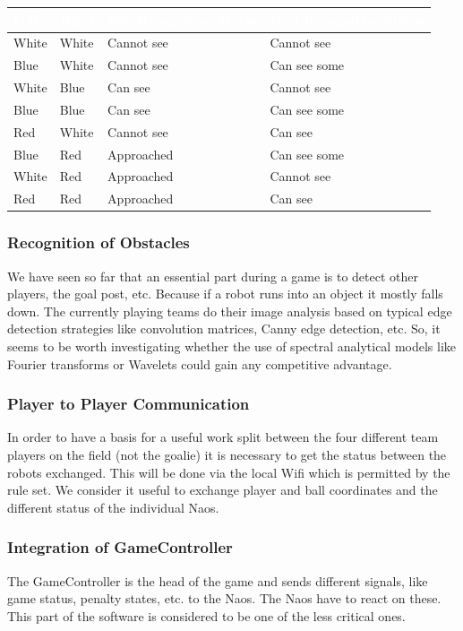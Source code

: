 \documentclass[12pt]{article}
\theoremstyle{definition}
\begin{document}
\begin{tabular}{|p{.08\linewidth}|p{.08\linewidth}|p{.31\linewidth}|p{.31\linewidth}|}
\hline
\cellcolor[gray]{0.5}\textcolor{white}{Left} & \cellcolor[gray]{0.45}\textcolor{white}{Right} & \cellcolor[gray]{0.5}\textcolor{white}{Ball Recognition Status} & \cellcolor[gray]{0.45}\textcolor{white}{Goal Recognition Status}\\ \hline
White&White&Cannot see & Cannot see \\ \hline
Blue&White&Cannot see & Can see some \\ \hline
White&Blue&Can see & Cannot see \\ \hline 
Blue&Blue&Can see & Can see some \\ \hline
Red&White& Cannot see & Can see \\ \hline
Blue&Red&Approached & Can see some \\ \hline
White&Red&Approached & Cannot see  \\ \hline
Red&Red& Approached & Can see \\ \hline
\end{tabular}

\subsubsection{Recognition of Obstacles}
We have seen so far that an essential part during a game is to detect other players, the goal post, etc. Because if a robot runs into an object it mostly falls down. The currently playing teams do their image analysis based on typical edge detection strategies like convolution matrices, Canny edge detection, etc. So, it seems to be worth investigating whether the use of spectral analytical models like Fourier transforms or Wavelets could gain any competitive advantage.

\subsubsection{Player to Player Communication}
In order to have a basis for a useful work split between the four different team players on the field (not the goalie) it is necessary to get the status between the robots exchanged. This will be done via the local Wifi which is permitted by the rule set. We consider it useful to exchange player and ball coordinates and the different status of the individual Naos.

\subsubsection{Integration of GameController}
The GameController is the head of the game and sends different signals, like game status, penalty states, etc. to the Naos. The Naos have to react on these. This part of the software is considered to be one of the less critical ones.
\end{document}
